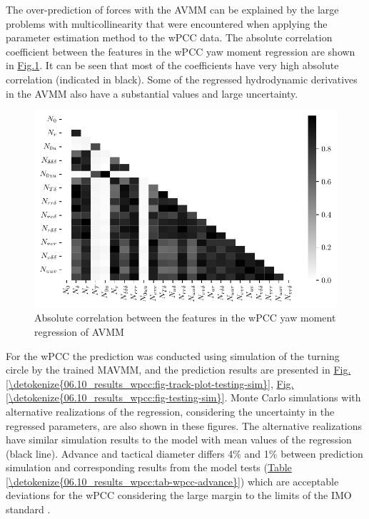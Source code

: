 The over-prediction of forces with the AVMM can be explained by the large problems with multicollinearity that were encountered when applying the parameter estimation method to the wPCC data. The absolute correlation coefficient between the features in the wPCC yaw moment regression are shown in \hyperref[\detokenize{06.10_results_wpcc:fig-ncorr}]{Fig.\@ \ref{\detokenize{06.10_results_wpcc:fig-ncorr}}}. It can be seen that most of the coefficients have very high absolute correlation (indicated in black). Some of the regressed hydrodynamic derivatives in the AVMM also have a substantial values and large uncertainty.

\begin{figure}[!htb]
\centering
\includegraphics{kappa/images/9.pdf}
\caption{Absolute correlation between the features in the wPCC yaw moment regression of AVMM}\label{\detokenize{06.10_results_wpcc:fig-ncorr}}\end{figure}


For the wPCC the prediction was conducted using simulation of the turning circle by the trained MAVMM, and the prediction results are presented in \hyperref[\detokenize{06.10_results_wpcc:fig-track-plot-testing-sim}]{Fig.\@ \ref{\detokenize{06.10_results_wpcc:fig-track-plot-testing-sim}}}, \hyperref[\detokenize{06.10_results_wpcc:fig-testing-sim}]{Fig.\@ \ref{\detokenize{06.10_results_wpcc:fig-testing-sim}}}. Monte Carlo simulations with alternative realizations of the regression, considering the uncertainty in the regressed parameters, are also shown in these figures. The alternative realizations have similar simulation results to the model with mean values of the regression (black line).
Advance and tactical diameter \cite{imo_standards_2002} differs 4\% and 1\% between prediction simulation and corresponding results from the model tests (\hyperref[\detokenize{06.10_results_wpcc:tab-wpcc-advance}]{Table \ref{\detokenize{06.10_results_wpcc:tab-wpcc-advance}}})
which are acceptable deviations for the wPCC considering the large margin to the limits of the IMO standard \cite{imo_standards_2002}.


